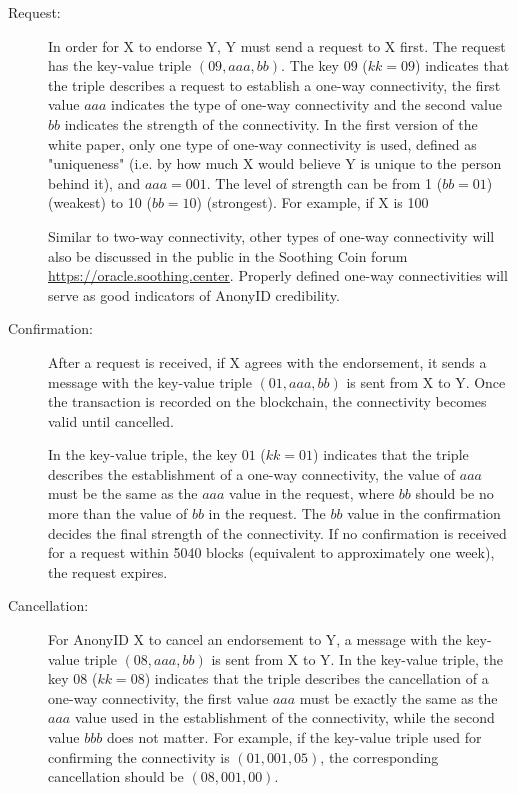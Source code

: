 \documentclass[12pt, a4paper]{article}
\begin{document}
\begin{description}

\item[Request:] In order for X to endorse Y, Y must send a request to X first. The request has the key-value triple $(09, aaa, bb)$. The key $09$ ($kk = 09$) indicates that the triple describes a request to establish a one-way connectivity, the first value $aaa$ indicates the type of one-way connectivity and the second value $bb$ indicates the strength of the connectivity. In the first version of the white paper, only one type of one-way connectivity is used, defined as "uniqueness" (i.e. by how much X would believe Y is unique to the person behind it), and $aaa = 001$. The level of strength can be from 1 ($bb = 01$) (weakest) to 10 ($bb = 10$) (strongest). For example, if X is 100%

Similar to two-way connectivity, other types of one-way connectivity will also be discussed in the public in the Soothing Coin forum \href{https://oracle.soothing.center}{https://oracle.soothing.center}. Properly defined one-way connectivities will serve as good indicators of AnonyID credibility.

\item[Confirmation:] After a request is received, if X agrees with the endorsement, it sends a message with the key-value triple $(01, aaa, bb)$ is sent from X to Y. Once the transaction is recorded on the blockchain, the connectivity becomes valid until cancelled.  

In the key-value triple, the key $01$ ($kk = 01$) indicates that the triple describes the establishment of a one-way connectivity, the value of $aaa$ must be the same as the $aaa$ value in the request, where $bb$ should be no more than the value of $bb$ in the request. The $bb$ value in the confirmation decides the final strength of the connectivity. If no confirmation is received for a request within 5040 blocks (equivalent to approximately one week), the request expires.

\item[Cancellation:] For AnonyID X to cancel an endorsement to Y, a message with the key-value triple $(08, aaa, bb)$ is sent from X to Y. In the key-value triple, the key $08$ ($kk = 08$) indicates that the triple describes the cancellation of a one-way connectivity, the first value $aaa$ must be exactly the same as the $aaa$ value used in the establishment of the connectivity, while the second value $bbb$ does not matter. For example, if the key-value triple used for confirming the connectivity is $(01, 001, 05)$, the corresponding cancellation should be $(08, 001, 00)$.


\end{description}
\end{document}

